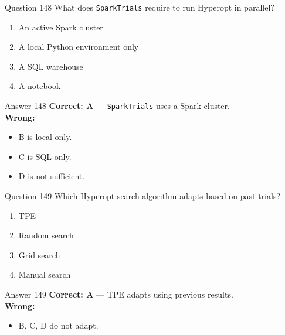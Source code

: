\documentclass[aspectratio=169,11pt]{beamer}
\begin{document}
	\begin{frame}{Question 148}
		What does \texttt{SparkTrials} require to run Hyperopt in parallel?
		\begin{enumerate}[label=\Alph*.]
			\item An active Spark cluster
			\item A local Python environment only
			\item A SQL warehouse
			\item A notebook
		\end{enumerate}
	\end{frame}
	\begin{frame}{Answer 148}
		\textbf{Correct: A} --- \texttt{SparkTrials} uses a Spark cluster.\\
		\vspace{0.5em}
		\textbf{Wrong:}
		\begin{itemize}
			\item B is local only.
			\item C is SQL-only.
			\item D is not sufficient.
		\end{itemize}
	\end{frame}
	
	\begin{frame}{Question 149}
		Which Hyperopt search algorithm adapts based on past trials?
		\begin{enumerate}[label=\Alph*.]
			\item TPE
			\item Random search
			\item Grid search
			\item Manual search
		\end{enumerate}
	\end{frame}
	\begin{frame}{Answer 149}
		\textbf{Correct: A} --- TPE adapts using previous results.\\
		\vspace{0.5em}
		\textbf{Wrong:}
		\begin{itemize}
			\item B, C, D do not adapt.
		\end{itemize}
	\end{frame}
	
\end{document}
